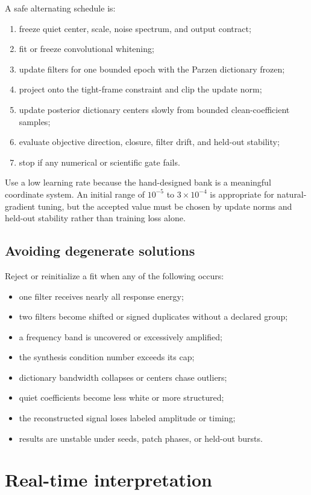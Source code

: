 \documentclass[11pt]{article}
\begin{document}
A safe alternating schedule is:
\begin{enumerate}[leftmargin=*]
\item freeze quiet center, scale, noise spectrum, and output contract;
\item fit or freeze convolutional whitening;
\item update filters for one bounded epoch with the Parzen dictionary frozen;
\item project onto the tight-frame constraint and clip the update norm;
\item update posterior dictionary centers slowly from bounded clean-coefficient
samples;
\item evaluate objective direction, closure, filter drift, and held-out
stability;
\item stop if any numerical or scientific gate fails.
\end{enumerate}
Use a low learning rate because the hand-designed bank is a meaningful
coordinate system. An initial range of $10^{-5}$ to $3\times10^{-4}$ is
appropriate for natural-gradient tuning, but the accepted value must be chosen
by update norms and held-out stability rather than training loss alone.

\subsection{Avoiding degenerate solutions}

Reject or reinitialize a fit when any of the following occurs:
\begin{itemize}[leftmargin=*]
\item one filter receives nearly all response energy;
\item two filters become shifted or signed duplicates without a declared group;
\item a frequency band is uncovered or excessively amplified;
\item the synthesis condition number exceeds its cap;
\item dictionary bandwidth collapses or centers chase outliers;
\item quiet coefficients become less white or more structured;
\item the reconstructed signal loses labeled amplitude or timing;
\item results are unstable under seeds, patch phases, or held-out bursts.
\end{itemize}

\section{Real-time interpretation}
\end{document}
